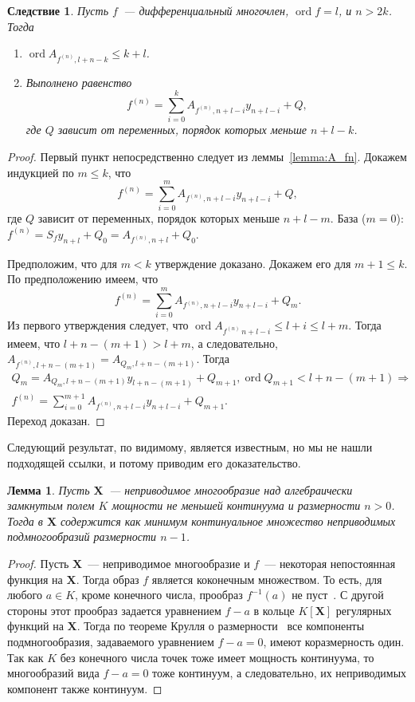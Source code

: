 \documentclass[16pt]{article}
\DeclareMathOperator{\ord}{ord}
\renewcommand{\le}{\leqslant} %
\theoremstyle{plain}
\newtheorem{lemma}[theorem]{Лемма}
\newtheorem{corollary}[theorem]{Следствие}
\theoremstyle{definition}
\theoremstyle{remark}
\begin{document}
\begin{corollary}\label{corollary:deriv_equal}
Пусть $f$~--- дифференциальный многочлен, $\ord f =l$, и $n>2k$.
Тогда
\begin{enumerate}
\item $\ord A_{f^{(n)},l+n-k}\leqslant k+l$.

\item Выполнено равенство
$$
f^{(n)}=\sum\limits_{i=0}^{k} A_{f^{(n)},n+l -i}y_{n+l -i} + Q,
$$
где $Q$ зависит от переменных, порядок которых меньше $n+l-k$.
\end{enumerate}
\end{corollary}
\begin{proof} Первый пункт непосредственно следует из леммы~\ref{lemma:A_fn}. Докажем индукцией по $m\le k$, что
$$
f^{(n)}=\sum\limits_{i=0}^{m} A_{f^{(n)},n+l -i}y_{n+l -i} + Q,
$$
где $Q$  зависит от переменных, порядок которых меньше $n+l-m$. База ($m = 0$): $f^{(n)}=S_fy_{n+l}+Q_0=A_{f^{(n)}, n + l}+Q_0$.

Предположим, что для $m<k$ утверждение доказано. Докажем его для $m+1\le k$. По предположению имеем, что
$$
f^{(n)}=\sum\limits_{i=0}^{m} A_{f^{(n)},n+l -i}y_{n+l -i} + Q_m.
$$
Из первого утверждения следует, что $\ord A_{f^{(n)}\,n+l -i}\le l+i\le l+m$. Тогда имеем, что $l+n-(m+1)>l+m$, а следовательно, $A_{f^{(n)}, l+n-(m+1)} = A_{Q_{m}, l+n-(m+1)}$.
Тогда
\begin{gather*}Q_{m}=A_{Q_{m}, l+n-(m+1)}y_{l+n-(m+1)}+Q_{m+1},\ord Q_{m+1}<l+n-(m+1)\Rightarrow \\ f^{(n)}=\sum\limits_{i=0}^{m+1} A_{f^{(n)},n+l -i}y_{n+l -i} + Q_{m+1}.
\end{gather*}
Переход доказан.
\end{proof}

Следующий результат, по видимому, является известным, но мы не нашли
подходящей ссылки, и потому приводим его доказательство.

\begin{lemma} \label{lemma:sb_vr_cntm}
Пусть $\mathbf{X}$~--- неприводимое многообразие над алгебраически замкнутым полем $K$
мощности не меньшей континуума и размерности $n>0$. Тогда в
$\mathbf{X}$ содержится как минимум континуальное множество
неприводимых подмногообразий размерности $n-1$.
\end{lemma}

\begin{proof}
Пусть $\mathbf{X}$~--- неприводимое многообразие и $f$~--- некоторая
непостоянная функция на $\mathbf{X}$. Тогда образ $f$ является
коконечным множеством. То есть, для любого $a\in K$, кроме конечного
числа, прообраз $f^{-1}(a)$ не пуст~\cite[Глава 2, параграф 3, упр 3.19]{Hartshorn}. С другой стороны
этот прообраз задается уравнением $f-a$ в кольце $K[\mathbf{X}]$
регулярных функций на $\mathbf{X}$. Тогда по теореме Крулля о размерности~\cite[Chapter~5,
Section~12, Theorem~18]{Matsumura} все
компоненты подмногообразия, задаваемого уравнением $f-a=0$, имеют
коразмерность один. Так как $K$ без конечного числа точек тоже
имеет мощность континуума, то многообразий вида $f-a=0$ тоже континуум, а следовательно, их
неприводимых компонент также континуум.
\end{proof}
\end{document}
